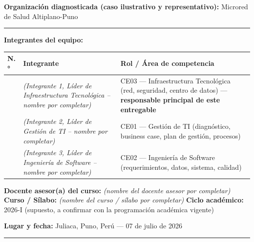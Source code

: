 \documentclass[11pt,a4paper]{article}
\begin{document}
\textbf{Organización diagnosticada (caso ilustrativo y representativo):} Microred de Salud Altiplano-Puno

\begin{center}\rule{0.5\linewidth}{0.5pt}\end{center}

\textbf{Integrantes del equipo:}

{\small
\begin{longtable}[]{@{}
  >{\raggedright\arraybackslash}p{}
  >{\raggedright\arraybackslash}p{}
  >{\raggedright\arraybackslash}p{}@{}}
\toprule\noalign{}
\begin{minipage}[b]{\linewidth}\raggedright
N.°
\end{minipage} & \begin{minipage}[b]{\linewidth}\raggedright
Integrante
\end{minipage} & \begin{minipage}[b]{\linewidth}\raggedright
Rol / Área de competencia
\end{minipage} \\
\midrule\noalign{}
\endhead
\bottomrule\noalign{}
\endlastfoot
1 & \textit{(Integrante 1, Líder de Infraestructura Tecnológica -- nombre por completar)} & CE03 --- Infraestructura Tecnológica (red, seguridad, centro de datos) --- \textbf{responsable principal de este entregable} \\
2 & \textit{(Integrante 2, Líder de Gestión de TI -- nombre por completar)} & CE01 --- Gestión de TI (diagnóstico, business case, plan de gestión, procesos) \\
3 & \textit{(Integrante 3, Líder de Ingeniería de Software -- nombre por completar)} & CE02 --- Ingeniería de Software (requerimientos, datos, sistema, calidad) \\
\end{longtable}
}

\textbf{Docente asesor(a) del curso:} \textit{(nombre del docente asesor por completar)}
\textbf{Curso / Sílabo:} \textit{(nombre del curso / s\'ilabo por completar)}
\textbf{Ciclo académico:} 2026-I (supuesto, a confirmar con la programación académica vigente)

\textbf{Lugar y fecha:} Juliaca, Puno, Perú --- 07 de julio de 2026

\begin{center}\rule{0.5\linewidth}{0.5pt}\end{center}
\end{document}
